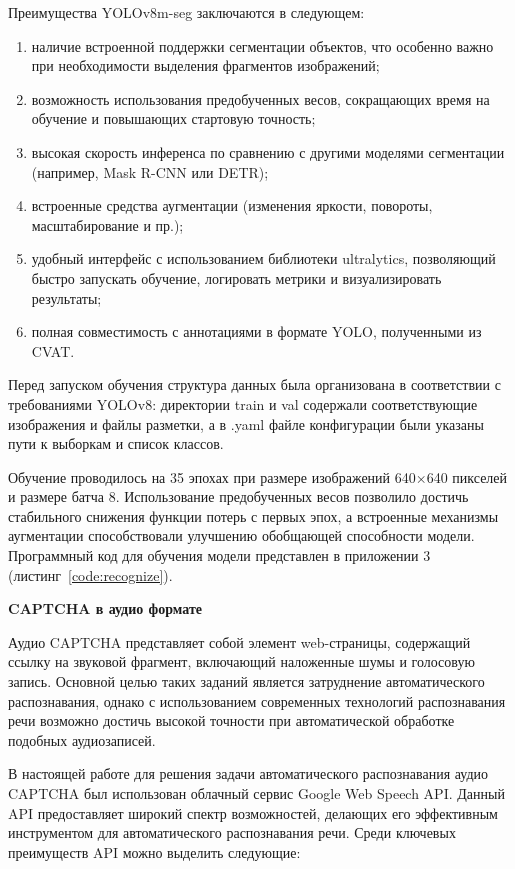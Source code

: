 Преимущества YOLOv8m-seg заключаются в следующем:

\begin{enumerate}
    \item наличие встроенной поддержки сегментации объектов, что особенно важно 
    при необходимости выделения фрагментов изображений;
    \item возможность использования предобученных весов, сокращающих время на 
    обучение и повышающих стартовую точность;
    \item высокая скорость инференса по сравнению с другими моделями сегментации 
    (например, Mask R-CNN или DETR);
    \item встроенные средства аугментации (изменения яркости, повороты, 
    масштабирование и пр.);
    \item удобный интерфейс с использованием библиотеки ultralytics, позволяющий 
    быстро запускать обучение, логировать метрики и визуализировать результаты;
    \item полная совместимость с аннотациями в формате YOLO, полученными из CVAT.
\end{enumerate}

Перед запуском обучения структура данных была организована в соответствии с 
требованиями YOLOv8: директории train и val содержали соответствующие изображения 
и файлы разметки, а в .yaml файле конфигурации были указаны пути к выборкам и 
список классов.

Обучение проводилось на 35 эпохах при размере изображений 640×640 пикселей и 
размере батча 8. Использование предобученных весов позволило достичь стабильного 
снижения функции потерь с первых эпох, а встроенные механизмы аугментации 
способствовали улучшению обобщающей способности модели. Программный код для 
обучения модели представлен в приложении 3 (листинг~\ref{code:recognize}).

\textbf{CAPTCHA в аудио формате}

Аудио CAPTCHA представляет собой элемент web-страницы, содержащий ссылку на 
звуковой фрагмент, включающий наложенные шумы и голосовую запись. Основной целью 
таких заданий является затруднение автоматического распознавания, однако с 
использованием современных технологий распознавания речи возможно достичь высокой 
точности при автоматической обработке подобных аудиозаписей.

В настоящей работе для решения задачи автоматического распознавания аудио CAPTCHA 
был использован облачный сервис Google Web Speech API. Данный API предоставляет 
широкий спектр возможностей, делающих его эффективным инструментом для 
автоматического распознавания речи. Среди ключевых преимуществ API можно выделить 
следующие:


